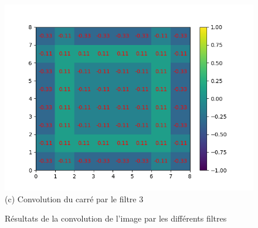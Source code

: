 \begin{figure}[h]
        \includegraphics[width=\textwidth]{img/cnn_exemple/square/convolution_filtre_3.png}
        \center 
        (c) Convolution du carré par le filtre 3
    \endminipage
    \caption{Résultats de la convolution de l'image par les différents filtres}
\end{figure}


